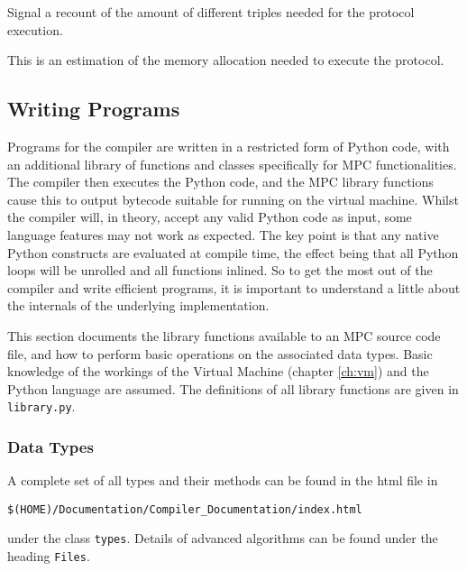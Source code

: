 Signal a recount of the amount of different triples needed for the protocol execution. 

This is an estimation of the memory allocation needed to execute the protocol.

\subsection{Writing Programs}

Programs for the compiler are written in a restricted form of Python code,
with an additional library of functions and classes specifically for MPC
functionalities. The compiler then executes the Python code, and the MPC
library functions cause this to output
bytecode suitable for running on the virtual machine.
Whilst the compiler will, in theory, accept any valid Python
code as input, some language features may not work as expected.
The key point is that any native Python constructs are evaluated at compile
time, the effect being that all Python loops will be unrolled and all functions
inlined.
So to get the most out of the compiler and write efficient programs,
it is important to understand a little about the internals of the underlying implementation.

This section documents the library functions available to an MPC source code
file, and how to perform basic operations on the associated data types.
Basic knowledge of the workings of the Virtual Machine
(chapter \ref{ch:vm}) and the Python language are assumed. The definitions
of all library functions are given in \verb|library.py|.

\subsubsection{Data Types}
\label{ref:datatypes}

A complete set of all types and their methods can be found in
the html file in
\begin{center}
   \verb+$(HOME)/Documentation/Compiler_Documentation/index.html+
\end{center}
under the class \verb+types+.
Details of advanced algorithms can be found under the heading
\verb+Files+.

